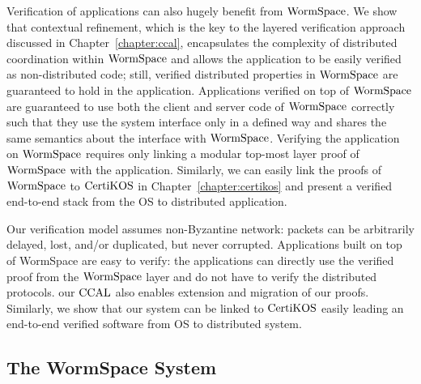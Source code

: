 Verification of applications can also hugely benefit from $\mathrm{WormSpace}$. We show that contextual refinement, which is the key to the layered verification approach discussed in Chapter~\ref{chapter:ccal}, encapsulates the complexity of distributed coordination within $\mathrm{WormSpace}$ and allows the application to be easily verified as non-distributed code; still, verified distributed properties in $\mathrm{WormSpace}$ are guaranteed to hold in the application. Applications verified on top of $\mathrm{WormSpace}$ are guaranteed to use both the client and server code of $\mathrm{WormSpace}$ correctly such that they use the system interface only in a defined way and shares the same semantics about the interface with $\mathrm{WormSpace}$. Verifying the application on $\mathrm{WormSpace}$ requires only linking a modular top-most layer proof of $\mathrm{WormSpace}$ with the application. Similarly, we can easily link the proofs of $\mathrm{WormSpace}$ to $\mathrm{CertiKOS}$ in Chapter~\ref{chapter:certikos} and present a verified end-to-end stack from the OS to distributed application.

Our verification model assumes non-Byzantine network: packets can be arbitrarily delayed, lost, and/or duplicated, but never corrupted. Applications built on top of WormSpace are easy to verify: the applications can directly use the verified proof from the $\mathrm{WormSpace}$ layer and do not have to verify the distributed protocols. our $\mathrm{CCAL}$ also enables extension and migration of our proofs. Similarly, we show that our system can be linked to $\mathrm{CertiKOS}$ easily leading an end-to-end verified software from OS to distributed system.
%


\subsection{The WormSpace System}
\label{chapter:wormspace:subsec:wormspace-system}


